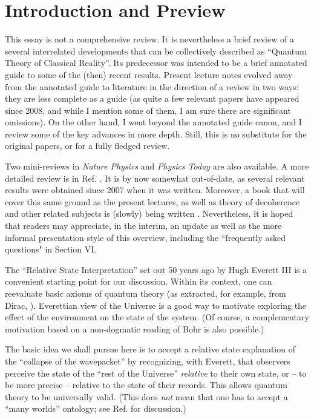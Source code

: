 \documentclass[aps,amsmath,amssymb,amsfonts,floatfix]{revtex4-1}
\newcommand{\+}         {\dagger}
\begin{document}
\section{Introduction and Preview}

This essay is not a comprehensive review. It is nevertheless a brief review of a several interrelated developments that can be collectively described as ``Quantum Theory of Classical Reality''.
Its predecessor %
was intended to be a brief  annotated guide to some of the (then) recent results. 
Present lecture notes evolved away from the annotated guide to literature in the direction of a review in two ways: they are less complete as a guide (as quite a few relevant papers have appeared since 2008, and while I mention some of them, I am sure there are significant omissions). On the other hand, I went beyond the annotated guide canon, and I review some of the key advances in more depth. Still, this is no substitute for the original papers, or for a fully fledged review. 

Two mini-reviews in {\it Nature Physics} \cite{ZurekNatPhys} and {\it Physics Today} \cite{ZurekPT} are also available. A more detailed review is in Ref. \cite{Z07a}. It is by now somewhat out-of-date, as several relevant results were obtained since 2007 when it was written. Moreover, a book that will cover this same ground as the present lectures, as well as theory of decoherence and other related subjects is (slowly) being written \cite{Zurekbook}. Nevertheless, it is hoped that readers may appreciate, in the interim,  an update as well as the more informal presentation style of this overview, including the ``frequently asked questions" in Section VI.

The  ``Relative State Interpretation'' set out 50 years ago by Hugh
Everett III \cite{25,26} is a convenient starting point for our discussion. Within its context, one can reevaluate basic axioms of quantum theory (as extracted, for example, from
Dirac, \cite{23}). Everettian view of the Universe is a good way to motivate exploring the effect of the environment
on the state of the system. (Of course, a complementary motivation based on a non-dogmatic
reading of Bohr \cite{11} is also possible.)

The basic idea we shall pursue here is to accept a relative state explanation of the  ``collapse of the
wavepacket'' by recognizing, with Everett, that observers perceive the state of the ``rest of the Universe''
{\it relative} to their own state, or -- to be more precise -- relative to the state of their records.
This allows quantum theory to be universally valid. (This does {\it not} mean that one has to accept
a ``many worlds'' ontology; see Ref. \cite{Z07a} for discussion.)
\end{document}
